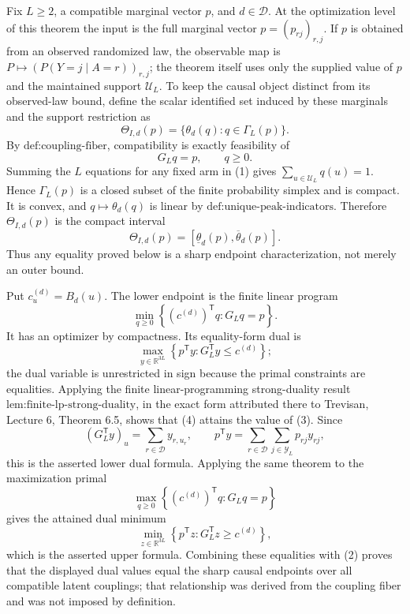 Fix \(L\ge2\), a compatible marginal vector \(p\), and \(d\in\mathcal D\).  At the optimization level of this theorem the input is the full marginal vector \(p=(p_{rj})_{r,j}\).  If \(p\) is obtained from an observed randomized law, the observable map is \(P\mapsto(P(Y=j\mid A=r))_{r,j}\); the theorem itself uses only the supplied value of \(p\) and the maintained support \(\mathcal U_L\).  To keep the causal object distinct from its observed-law bound, define the scalar identified set induced by these marginals and the support restriction as
\[
 \Theta_{I,d}(p)=\{\theta_d(q):q\in\Gamma_L(p)\}.
\]
By \(\text{def:coupling-fiber}\), compatibility is exactly feasibility of
\[
 G_Lq=p,\qquad q\ge0.
 \tag{1}
\]
Summing the \(L\) equations for any fixed arm in (1) gives \(\sum_{u\in\mathcal U_L}q(u)=1\).  Hence \(\Gamma_L(p)\) is a closed subset of the finite probability simplex and is compact.  It is convex, and \(q\mapsto\theta_d(q)\) is linear by \(\text{def:unique-peak-indicators}\).  Therefore \(\Theta_{I,d}(p)\) is the compact interval
\[
 \Theta_{I,d}(p)=[\underline\theta_d(p),\overline\theta_d(p)].
 \tag{2}
\]
Thus any equality proved below is a sharp endpoint characterization, not merely an outer bound.

Put \(c^{(d)}_u=B_d(u)\).  The lower endpoint is the finite linear program
\[
 \min_{q\ge0}\left\{(c^{(d)})^{\mathsf T}q:G_Lq=p\right\}.
 \tag{3}
\]
It has an optimizer by compactness.  Its equality-form dual is
\[
 \max_{y\in\mathbb R^{3L}}
 \left\{p^{\mathsf T}y:G_L^{\mathsf T}y\le c^{(d)}\right\};
 \tag{4}
\]
the dual variable is unrestricted in sign because the primal constraints are equalities.  Applying the finite linear-programming strong-duality result \(\text{lem:finite-lp-strong-duality}\), in the exact form attributed there to Trevisan, Lecture 6, Theorem 6.5, shows that (4) attains the value of (3).  Since
\[
 (G_L^{\mathsf T}y)_u=\sum_{r\in\mathcal D}y_{r,u_r},
 \qquad
 p^{\mathsf T}y=\sum_{r\in\mathcal D}\sum_{j\in\mathcal Y_L}p_{rj}y_{rj},
\]
this is the asserted lower dual formula.  Applying the same theorem to the maximization primal
\[
 \max_{q\ge0}\left\{(c^{(d)})^{\mathsf T}q:G_Lq=p\right\}
\]
gives the attained dual minimum
\[
 \min_{z\in\mathbb R^{3L}}
 \left\{p^{\mathsf T}z:G_L^{\mathsf T}z\ge c^{(d)}\right\},
\]
which is the asserted upper formula.  Combining these equalities with (2) proves that the displayed dual values equal the sharp causal endpoints over all compatible latent couplings; that relationship was derived from the coupling fiber and was not imposed by definition.

